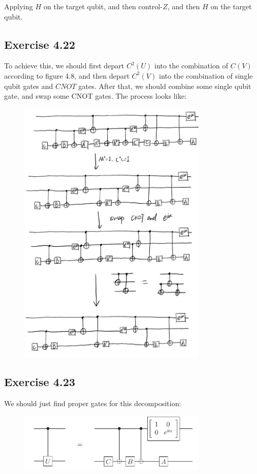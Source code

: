 Applying $H$ on the target qubit, and then control-$Z$, and then $H$ on the target qubit.

\subsection*{Exercise 4.22}

To achieve this, we should first depart $C^2(U)$ into the combination of $C(V)$ according to figure 4.8, and then depart $C^2(V)$ into the combination of single qubit gates and $CNOT$ gates. After that, we should combine some single qubit gate, and swap some CNOT gates. The process looks like: 
\begin{figure}[htbp]
    \centering
    \includegraphics[width=0.8\textwidth]{figures/4-22.jpg}
    \caption{}
    \label{}
\end{figure}

\subsection*{Exercise 4.23}
We should just find proper gates for this decomposition:
\begin{figure}[htbp]
    \centering
    \includegraphics[width=0.8\textwidth]{figures/4-23.jpg}
    \caption{}
    \label{}
\end{figure}

